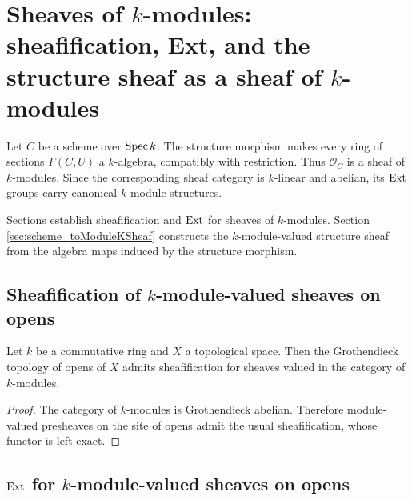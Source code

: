 \chapter{Sheaves of \(k\)-modules: sheafification, Ext, and the structure sheaf as a sheaf of \(k\)-modules}
\label{chap:Cohomology_StructureSheafModuleK}

Let \(C\) be a scheme over \(\operatorname{Spec} k\). The structure morphism makes every ring of sections \(\Gamma(C,U)\) a \(k\)-algebra, compatibly with restriction. Thus \(\mathcal O_C\) is a sheaf of \(k\)-modules. Since the corresponding sheaf category is \(k\)-linear and abelian, its \(\operatorname{Ext}\) groups carry canonical \(k\)-module structures.

Sections  establish sheafification and \(\operatorname{Ext}\) for sheaves of \(k\)-modules. Section \cref{sec:scheme_toModuleKSheaf} constructs the \(k\)-module-valued structure sheaf from the algebra maps induced by the structure morphism.

\section{Sheafification of \(k\)-module-valued sheaves on opens}
\label{sec:moduleK_prereqs}

\begin{theorem}\leanok
  \label{thm:HasSheafify_Opens_ModuleCatK}
  Let \(k\) be a commutative ring and \(X\) a topological space. Then the Grothendieck topology of opens of \(X\) admits sheafification for sheaves valued in the category of \(k\)-modules.
\end{theorem}

\begin{proof}


\leanok
  The category of \(k\)-modules is Grothendieck abelian. Therefore module-valued presheaves on the site of opens admit the usual sheafification, whose functor is left exact.
\end{proof}

\section{\(\operatorname{Ext}\) for \(k\)-module-valued sheaves on opens}
\label{sec:moduleK_ext}

